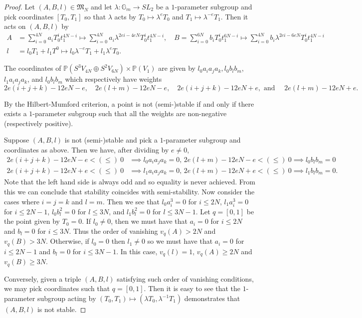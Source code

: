 \documentclass[11pt]{amsart}
\theoremstyle{definition}
\theoremstyle{remark}
\newcommand{\mb}[1]{\mathbb{#1}}
\begin{document}
	\begin{proof} Let $(A,B,l) \in \mathfrak{M}_N$ and let $\lambda: \mb{G}_m \to SL_2$ be a $1$-parameter subgroup and pick coordinates $[T_0, T_1]$ so that $\lambda$ acts by $T_0 \mapsto \lambda^e T_0$ and $T_1 \mapsto \lambda^{-e}T_1$. Then it acts on $(A,B,l)$ by
		\begin{align*}
			A &= \sum_{i = 0}^{4N} a_i T_0^i t_1^{4N - i} \mapsto \sum_{i = 0}^{4N} a_i \lambda^{2ei - 4eN} T_0^i t_1^{4N - i}, \quad 
			B = \sum_{i = 0}^{6N} b_i T_0^i t_1^{6N - i} \mapsto \sum_{i = 0}^{4N} b_i \lambda^{2ei - 6eN} T_0^i t_1^{4N - i} \\
			l &= l_0T_1 + l_1T^0 \mapsto l_0\lambda^{-e}T_1 + l_1 \lambda^eT_0.
		\end{align*}
		
		The coordinates of $\mb{P}(S^3V_{4N}\oplus S^2V_{6N}) \times \mb{P}(V_1)$ are given by $l_0a_ia_ja_k, l_0b_lb_m$, $l_1a_ia_ja_k$, and $l_0b_lb_m$ which  respectively have weights 
		$$
		2e(i + j + k) - 12eN - e, \quad
		2e(l + m) - 12eN - e, \quad
		2e(i + j + k) - 12eN + e,  \text{ and } \quad
		2e(l + m) - 12eN + e.$$
		
		By the Hilbert-Mumford criterion,  a point is not (semi-)stable if and only if there exists a $1$-parameter subgroup such that all the weights are non-negative (respectively positive).
		
		Suppose $(A,B,l)$ is not (semi-)stable and pick a $1$-parameter subgroup and coordinates as above. Then we have, after dividing by $e \neq 0$,
		\begin{align*}
			2e(i + j + k) - 12eN - e < (\le) \ 0 &\implies l_0a_ia_ja_k = 0, \,
			2e(l + m) - 12eN - e < (\le) \ 0 \implies l_0b_lb_m = 0\\
			2e(i + j + k) - 12eN + e < (\le) \ 0 &\implies l_1a_ia_ja_k = 0, \,
			2e(l + m) - 12eN + e < (\le) \ 0 \implies l_1b_lb_m = 0.
		\end{align*}
		Note that the left hand side is always odd and so equality is never achieved. From this we can conclude that stability coincides with semi-stability.  Now consider the cases where $i = j = k$ and $l = m$. Then we see that $l_0a_i^3 = 0$ for $i \le 2N$, $l_1a_i^3 = 0$ for $i \le 2N - 1$, $l_0b_l^2 = 0$ for $l \le 3N$, and $l_1b_l^2 = 0$ for $l \le 3N - 1$. Let $q = [0,1]$ be the point given by $T_0 = 0$. If $l_0 \neq 0$, then we must have that $a_i = 0$ for $i \le 2N$ and $b_l = 0$ for $i \le 3N$. Thus the order of vanishing $v_q(A) > 2N$ and $v_q(B) > 3N$.  Otherwise, if $l_0 = 0$ then $l_1 \neq 0$ so we must have that $a_i = 0$ for $i \le 2N - 1$ and $b_l = 0$ for $i \le 3N - 1$. In this case, $v_q(l) = 1$, $v_q(A) \geq 2N$ and $v_q(B) \geq 3N$. 
		
		Conversely, given a triple $(A,B,l)$ satisfying such order of vanishing conditions, we may pick coordinates such that $q = [0,1]$. Then it is easy to see that the $1$-parameter subgroup acting by $(T_0, T_1) \mapsto (\lambda T_0, \lambda^{-1}T_1)$ demonstrates that $(A,B,l)$ is not stable.  \end{proof} 
	
\end{document}
